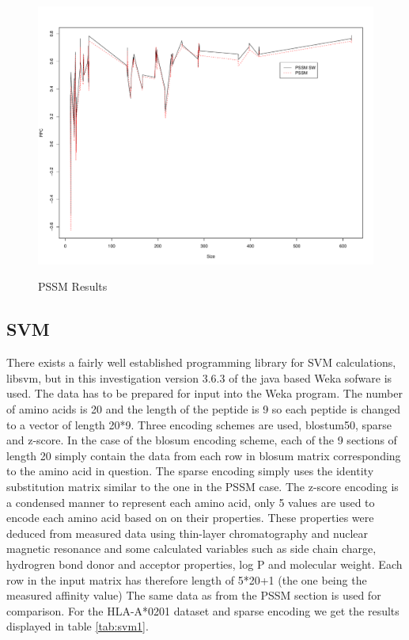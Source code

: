 \begin{figure}
\begin{center}
\includegraphics[width=12cm]{fig/pssm1.pdf}
\label{fig:pssm1}
\caption{PSSM Results}
\end{center}
\end{figure}

\subsection*{SVM}
There exists a fairly well established programming library for SVM calculations, libsvm, but in this investigation version 3.6.3 of the java based Weka sofware is used. 
The data has to be prepared for input into the Weka program.
The number of amino acids is 20 and the length of the peptide is 9 so each peptide is changed to a vector of length 20*9. 
Three encoding schemes are used, blostum50, sparse and z-score. 
In the case of the blosum encoding scheme, each of the 9 sections of length 20 simply contain the data from each row in blosum matrix corresponding to the amino acid in question.
The sparse encoding simply uses the identity substitution matrix similar to the one in the PSSM case. 
The z-score encoding is a condensed manner to represent each amino acid, only 5 values are used to encode each amino acid based on on their properties. 
These properties were deduced from measured data using thin-layer chromatography and nuclear magnetic resonance and some calculated variables 
such as side chain charge, hydrogren bond donor and acceptor properties, log P and molecular weight. 
Each row in the input matrix has therefore length of 5*20+1 (the one being the measured affinity value)
The same data as from the PSSM section is used for comparison. For the HLA-A*0201 dataset and sparse encoding we get the results displayed in table \ref{tab:svm1}.

